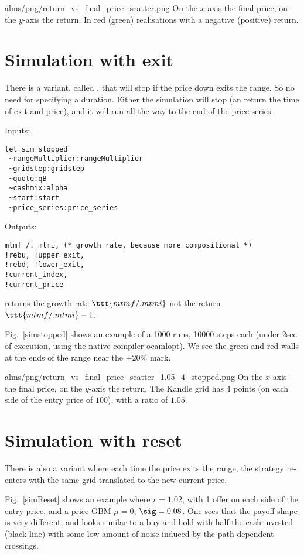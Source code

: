 \documentclass[oneside]{article}
\begin{document}
\IG{300pt}
{alms/png/return_vs_final_price_scatter.png}
{\label{sim} On the $x$-axis the final price, on the $y$-axis the return. In red (green) realisations with a negative (positive) return.}

\section{Simulation with exit}
There is a variant, called , that will stop if the price down exits the range. So no need for specifying a duration.
Either the simulation will stop (an return the time of exit and price), and it will run all the way to the
end of the price series.

Inputs:
\begin{verbatim}
let sim_stopped 
 ~rangeMultiplier:rangeMultiplier 
 ~gridstep:gridstep 
 ~quote:qB 
 ~cashmix:alpha
 ~start:start 
 ~price_series:price_series 
\end{verbatim}
 
Outputs:
\begin{verbatim}
mtmf /. mtmi, (* growth rate, because more compositional *)
!rebu, !upper_exit,
!rebd, !lower_exit, 
!current_index,
!current_price
\end{verbatim}


\NB[1]  returns the growth rate $\ttt{mtmf /. mtmi}$ not the return $\ttt{mtmf /. mtmi} - 1$.

Fig.~\ref{simstopped} shows an example of a 1000 runs, 10000 steps each (under 2sec of execution, using the native compiler ocamlopt). 
We see the green and red walls at the ends of the range near the $\pm20\%$ mark.

\IG{250pt}
{alms/png/return_vs_final_price_scatter_1.05_4_stopped.png}
{\label{simstopped} On the $x$-axis the final price, on the $y$-axis the return. The Kandle grid has 4 points (on each side of the entry price of $100$), with a ratio of $1.05$.}


\section{Simulation with reset}
There is also a  variant where each time the price exits the range,
the strategy re-enters with the same grid translated to the new current price.

Fig.~\ref{simReset} shows an example where $r=1.02$, with 1 offer on each side of the entry price, and a price GBM $\mu=0$, $\sig=0.08$.
One sees that the payoff shape is very different, and looks
similar to a buy and hold with half the cash invested (black line)
with some low amount of noise induced by the path-dependent crossings.
\end{document}
